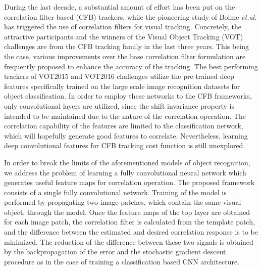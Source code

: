 \documentclass[journal]{IEEEtran}
\begin{document}
During the last decade, a substantial amount of effort has been put on the correlation filter based (CFB) trackers, while the pioneering study of Bolme \emph{et.al.} \cite{MOSSE} has triggered the use of correlation filters for visual tracking. Concretely, the attractive participants and the winners of the Visual Object Tracking (VOT) challenges are from the CFB tracking family in the last three years. This being the case, various improvements over the base correlation filter formulation are frequently proposed to enhance the accuracy of the tracking. The best performing trackers of VOT2015 \cite{VOT2015} and VOT2016 \cite{VOT2016} challenges utilize the pre-trained deep features \cite{VGG} specifically trained on the large scale image recognition datasets \cite{ImageNet,ILSVRC2015} for object classification. In order to employ these networks to the CFB frameworks, only convolutional layers are utilized, since the shift invariance property is intended to be maintained due to the nature of the correlation operation. The correlation capability of the features are limited to the classification network, which will hopefully generate good features to correlate. Nevertheless, learning deep convolutional features for CFB tracking cost function is still unexplored. 

In order to break the limits of the aforementioned models of object recognition, we address the problem of learning a fully convolutional neural network which generates useful feature maps for correlation operation. The proposed framework consists of a single fully convolutional network. Training of the model is performed by propagating two image patches, which contain the same visual object, through the model. Once the feature maps of the top layer are obtained for each image patch, the correlation filter is calculated from the template patch, and the difference between the estimated and desired correlation response is to be minimized. The reduction of the difference between these two signals is obtained by the backpropagation of the error and the stochastic gradient descent procedure as in the case of training a classification based CNN architecture.
\end{document}
